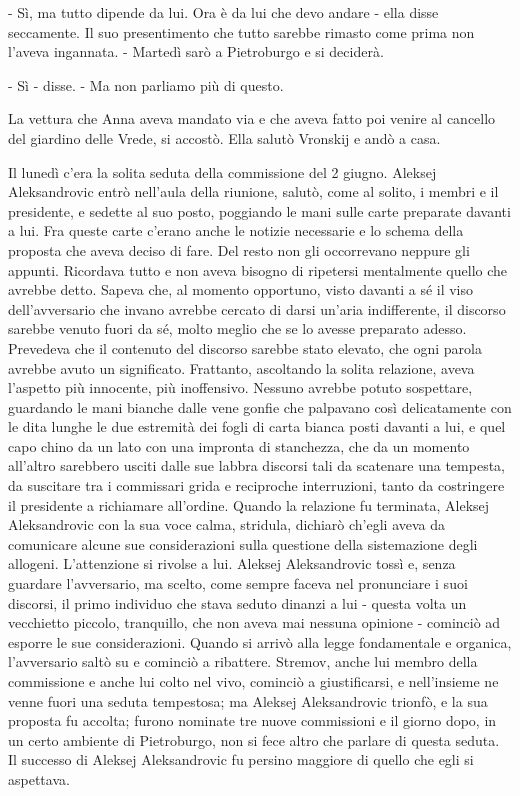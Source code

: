 - Sì, ma tutto dipende da lui. Ora è da lui che devo andare - ella disse seccamente. Il suo presentimento che tutto sarebbe rimasto come prima non l'aveva ingannata. - Martedì sarò a Pietroburgo e si deciderà. 

- Sì - disse. - Ma non parliamo più di questo. 

La vettura che Anna aveva mandato via e che aveva fatto poi venire al cancello del giardino delle Vrede, si accostò. Ella salutò Vronskij e andò a casa. 

Il lunedì c'era la solita seduta della commissione del 2 giugno. Aleksej Aleksandrovic entrò nell'aula della riunione, salutò, come al solito, i membri e il presidente, e sedette al suo posto, poggiando le mani sulle carte preparate davanti a lui. Fra queste carte c'erano anche le notizie necessarie e lo schema della proposta che aveva deciso di fare. Del resto non gli occorrevano neppure gli appunti. Ricordava tutto e non aveva bisogno di ripetersi mentalmente quello che avrebbe detto. Sapeva che, al momento opportuno, visto davanti a sé il viso dell'avversario che invano avrebbe cercato di darsi un'aria indifferente, il discorso sarebbe venuto fuori da sé, molto meglio che se lo avesse preparato adesso. Prevedeva che il contenuto del discorso sarebbe stato elevato, che ogni parola avrebbe avuto un significato. Frattanto, ascoltando la solita relazione, aveva l'aspetto più innocente, più inoffensivo. Nessuno avrebbe potuto sospettare, guardando le mani bianche dalle vene gonfie che palpavano così delicatamente con le dita lunghe le due estremità dei fogli di carta bianca posti davanti a lui, e quel capo chino da un lato con una impronta di stanchezza, che da un momento all'altro sarebbero usciti dalle sue labbra discorsi tali da scatenare una tempesta, da suscitare tra i commissari grida e reciproche interruzioni, tanto da costringere il presidente a richiamare all'ordine. Quando la relazione fu terminata, Aleksej Aleksandrovic con la sua voce calma, stridula, dichiarò ch'egli aveva da comunicare alcune sue considerazioni sulla questione della sistemazione degli allogeni. L'attenzione si rivolse a lui. Aleksej Aleksandrovic tossì e, senza guardare l'avversario, ma scelto, come sempre faceva nel pronunciare i suoi discorsi, il primo individuo che stava seduto dinanzi a lui - questa volta un vecchietto piccolo, tranquillo, che non aveva mai nessuna opinione - cominciò ad esporre le sue considerazioni. Quando si arrivò alla legge fondamentale e organica, l'avversario saltò su e cominciò a ribattere. Stremov, anche lui membro della commissione e anche lui colto nel vivo, cominciò a giustificarsi, e nell'insieme ne venne fuori una seduta tempestosa; ma Aleksej Aleksandrovic trionfò, e la sua proposta fu accolta; furono nominate tre nuove commissioni e il giorno dopo, in un certo ambiente di Pietroburgo, non si fece altro che parlare di questa seduta. Il successo di Aleksej Aleksandrovic fu persino maggiore di quello che egli si aspettava. 

